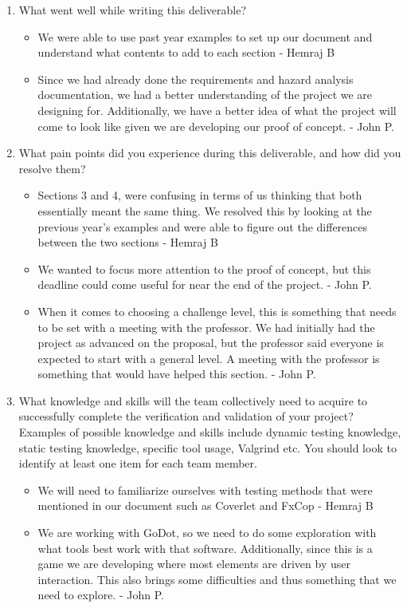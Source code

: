 \documentclass[12pt, titlepage]{article}
\begin{document}
\begin{enumerate}
  \item What went well while writing this deliverable? 
  \begin{itemize}
    \item We were able to use past year examples to set up our document and understand what contents to add to each section - Hemraj B
    \item Since we had already done the requirements and hazard analysis documentation, we had a better understanding of the project we are designing for. Additionally, we have a better idea of what the project will come to look like given we are developing our proof of concept. - John P.
  \end{itemize}
  \item What pain points did you experience during this deliverable, and how
    did you resolve them?
    \begin{itemize}
      \item Sections 3 and 4, were confusing in terms of us thinking that both essentially meant the same thing. We resolved this by looking at the previous year's examples and were able to figure out the differences between the two sections - Hemraj B
      \item We wanted to focus more attention to the proof of concept, but this deadline could come useful for near the end of the project. - John P.
      \item When it comes to choosing a challenge level, this is something that needs to be set with a meeting with the professor. We had initially had the project as advanced on the proposal, but the professor said everyone is expected to start with a general level. A meeting with the professor is something that would have helped this section. - John P.
    \end{itemize}
  \item What knowledge and skills will the team collectively need to acquire to
  successfully complete the verification and validation of your project?
  Examples of possible knowledge and skills include dynamic testing knowledge,
  static testing knowledge, specific tool usage, Valgrind etc.  You should look to
  identify at least one item for each team member.
  \begin{itemize}
    \item We will need to familiarize ourselves with testing methods that were mentioned in our document such as Coverlet and FxCop  - Hemraj B
    \item We are working with GoDot, so we need to do some exploration with what tools best work with that software. Additionally, since this is a game we are developing where most elements are driven by user interaction. This also brings some difficulties and thus something that we need to explore. - John P.

\end{itemize}
\end{enumerate}
\end{document}

